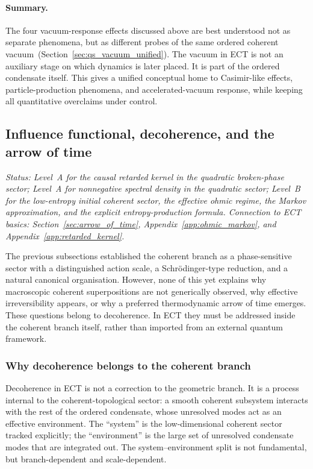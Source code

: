 \paragraph{Summary.}
The four vacuum-response effects discussed above are best understood
not as separate phenomena, but as different probes of the same ordered
coherent vacuum~(Section~\ref{sec:qs_vacuum_unified}).
The vacuum in ECT is not an auxiliary stage on which dynamics is later
placed.
It is part of the ordered condensate itself.
This gives a unified conceptual home to Casimir-like effects,
particle-production phenomena, and accelerated-vacuum response, while
keeping all quantitative overclaims under control.

\subsection{Influence functional, decoherence, and the arrow of time}
\label{sec:qs_decoherence}

\textit{Status: Level~A for the causal retarded kernel in the
quadratic broken-phase sector; Level~A for nonnegative spectral
density in the quadratic sector; Level~B for the low-entropy initial
coherent sector, the effective ohmic regime, the Markov approximation,
and the explicit entropy-production formula.
Connection to ECT basics: Section~\ref{sec:arrow_of_time},
Appendix~\ref{app:ohmic_markov}, and Appendix~\ref{app:retarded_kernel}.}

\medskip
The previous subsections established the coherent branch as a
phase-sensitive sector with a distinguished action scale, a
Schr\"odinger-type reduction, and a natural canonical organisation.
However, none of this yet explains why macroscopic coherent
superpositions are not generically observed, why effective
irreversibility appears, or why a preferred thermodynamic arrow of
time emerges.
These questions belong to decoherence.
In ECT they must be addressed inside the coherent branch itself,
rather than imported from an external quantum framework.

\subsubsection*{Why decoherence belongs to the coherent branch}

Decoherence in ECT is not a correction to the geometric branch.
It is a process internal to the coherent-topological sector:
a smooth coherent subsystem interacts with the rest of the ordered
condensate, whose unresolved modes act as an effective environment.
The ``system'' is the low-dimensional coherent sector tracked
explicitly; the ``environment'' is the large set of unresolved
condensate modes that are integrated out.
The system--environment split is not fundamental, but branch-dependent
and scale-dependent.

